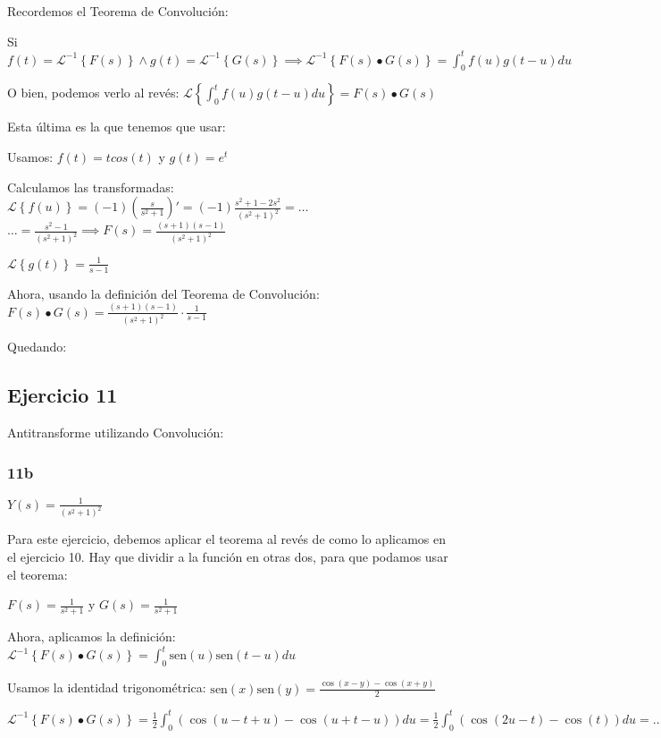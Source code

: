 \documentclass[11pt]{article}
\def\sen{\mathrm{sen}}
\newcommand{\lapl}[1]{\mathscr{L} \left\lbrace {#1} \right\rbrace}
\newcommand{\ilapl}[1]{\mathscr{L}^{-1} \left\lbrace {#1} \right\rbrace}
\begin{document}
	Recordemos el Teorema de Convolución:
	
	Si $\displaystyle f(t)=\ilapl{F(s)} \wedge g(t)=\ilapl{G(s)} \implies \ilapl{F(s) \bullet G(s)}=\int_{0}^{t}f(u)g(t-u)du$
	
	O bien, podemos verlo al revés: $\displaystyle \lapl{\int_{0}^{t}f(u)g(t-u)du}=F(s) \bullet G(s)$
	
	Esta última es la que tenemos que usar:
	
	Usamos: $f(t)=tcos(t)$ y $g(t)=e^{t}$
	
	Calculamos las transformadas: $\displaystyle \lapl{f(u)}=(-1)\left(\frac{s}{s^2+1}\right)'=(-1)\frac{s^2+1-2s^2}{(s^2+1)^2}= \dots$\\
	$\displaystyle \dots = \frac{s^2-1}{(s^2+1)^2} \implies F(s)=\frac{(s+1)(s-1)}{(s^2+1)^2}$
	
	$\displaystyle \lapl{g(t)}=\frac{1}{s-1}$
	
	Ahora, usando la definición del Teorema de Convolución: $\displaystyle F(s) \bullet G(s) = \frac{(s+1)(s-1)}{(s^2+1)^2}\cdot \frac{1}{s-1}$
	
	Quedando: 
	
	\subsection{Ejercicio 11}
	Antitransforme utilizando Convolución:
	\subsubsection{11b}
	$\displaystyle Y(s)=\frac{1}{(s^2+1)^2}$
	
	Para este ejercicio, debemos aplicar el teorema al revés de como lo aplicamos en el ejercicio 10. Hay que dividir a la función en otras dos, para que podamos usar el teorema:
	
	$\displaystyle F(s)=\frac{1}{s^2+1}$ y $\displaystyle G(s)=\frac{1}{s^2+1}$
	
	Ahora, aplicamos la definición:\\
	$\displaystyle \ilapl{F(s)\bullet G(s)}= \int_{0}^{t}\sen(u)\sen(t-u)du$
	
	Usamos la identidad trigonométrica: $\displaystyle \sen(x)\sen(y)=\frac{\cos(x-y)-\cos(x+y)}{2}$
	
	$\displaystyle \ilapl{F(s)\bullet G(s)}= \frac{1}{2} \int_{0}^{t}(\cos(u-t+u)-\cos(u+t-u))du=\frac{1}{2}\int_{0}^{t}(\cos(2u-t)-\cos(t))du = \dots$
	
\end{document}
